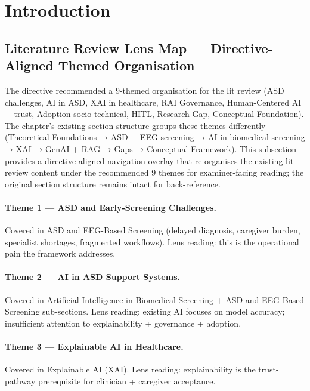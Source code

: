 \section{Introduction}

\subsection{Literature Review Lens Map --- Directive-Aligned Themed Organisation}
\label{sec:ch2_lit_review_lens_map}

The directive recommended a 9-themed organisation for the lit review (ASD challenges, AI in ASD, XAI in healthcare, RAI Governance, Human-Centered AI + trust, Adoption socio-technical, HITL, Research Gap, Conceptual Foundation). The chapter's existing section structure groups these themes differently (Theoretical Foundations → ASD + EEG screening → AI in biomedical screening → XAI → GenAI + RAG → Gaps → Conceptual Framework). This subsection provides a directive-aligned navigation overlay that re-organises the existing lit review content under the recommended 9 themes for examiner-facing reading; the original section structure remains intact for back-reference.

\paragraph{Theme 1 --- ASD and Early-Screening Challenges.} Covered in ASD and EEG-Based Screening (delayed diagnosis, caregiver burden, specialist shortages, fragmented workflows). Lens reading: this is the operational pain the framework addresses.

\paragraph{Theme 2 --- AI in ASD Support Systems.} Covered in Artificial Intelligence in Biomedical Screening + ASD and EEG-Based Screening sub-sections. Lens reading: existing AI focuses on model accuracy; insufficient attention to explainability + governance + adoption.

\paragraph{Theme 3 --- Explainable AI in Healthcare.} Covered in Explainable AI (XAI). Lens reading: explainability is the trust-pathway prerequisite for clinician + caregiver acceptance.

